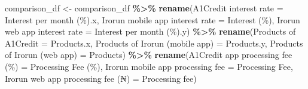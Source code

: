 \documentclass[
]{article}
\newenvironment{Shaded}{\begin{snugshade}}{\end{snugshade}}
\newcommand{\AttributeTok}[1]{\textcolor[rgb]{0.13,0.29,0.53}{#1}}
\newcommand{\FunctionTok}[1]{\textcolor[rgb]{0.13,0.29,0.53}{\textbf{#1}}}
\newcommand{\NormalTok}[1]{#1}
\newcommand{\OtherTok}[1]{\textcolor[rgb]{0.56,0.35,0.01}{#1}}
\newcommand{\SpecialCharTok}[1]{\textcolor[rgb]{0.81,0.36,0.00}{\textbf{#1}}}
\newcommand{\StringTok}[1]{\textcolor[rgb]{0.31,0.60,0.02}{#1}}
\begin{document}
\begin{Shaded}
\begin{Highlighting}[]
\NormalTok{comparison\_df }\OtherTok{\textless{}{-}}\NormalTok{ comparison\_df }\SpecialCharTok{\%\textgreater{}\%}
  \FunctionTok{rename}\NormalTok{(}\StringTok{\textasciigrave{}}\AttributeTok{A1Credit interest rate}\StringTok{\textasciigrave{}} \OtherTok{=} \StringTok{\textasciigrave{}}\AttributeTok{Interest per month (\%).x}\StringTok{\textasciigrave{}}\NormalTok{,}
         \StringTok{\textasciigrave{}}\AttributeTok{Irorun mobile app interest rate}\StringTok{\textasciigrave{}} \OtherTok{=} \StringTok{\textasciigrave{}}\AttributeTok{Interest (\%)}\StringTok{\textasciigrave{}}\NormalTok{,}
         \StringTok{\textasciigrave{}}\AttributeTok{Irorun web app interest rate}\StringTok{\textasciigrave{}} \OtherTok{=} \StringTok{\textasciigrave{}}\AttributeTok{Interest per month (\%).y}\StringTok{\textasciigrave{}}\NormalTok{) }\SpecialCharTok{\%\textgreater{}\%} 
  \FunctionTok{rename}\NormalTok{(}\StringTok{\textasciigrave{}}\AttributeTok{Products of A1Credit}\StringTok{\textasciigrave{}} \OtherTok{=}\NormalTok{ Products.x,}
         \StringTok{\textasciigrave{}}\AttributeTok{Products of Irorun (mobile app)}\StringTok{\textasciigrave{}} \OtherTok{=}\NormalTok{ Products.y,}
         \StringTok{\textasciigrave{}}\AttributeTok{Products of Irorun (web app)}\StringTok{\textasciigrave{}} \OtherTok{=}\NormalTok{ Products) }\SpecialCharTok{\%\textgreater{}\%} 
  \FunctionTok{rename}\NormalTok{(}\StringTok{\textasciigrave{}}\AttributeTok{A1Credit app processing fee (\%)}\StringTok{\textasciigrave{}} \OtherTok{=} \StringTok{\textasciigrave{}}\AttributeTok{Processing Fee (\%)}\StringTok{\textasciigrave{}}\NormalTok{,}
         \StringTok{\textasciigrave{}}\AttributeTok{Irorun mobile app processing fee}\StringTok{\textasciigrave{}} \OtherTok{=} \StringTok{\textasciigrave{}}\AttributeTok{Processing Fee}\StringTok{\textasciigrave{}}\NormalTok{,}
         \StringTok{\textasciigrave{}}\AttributeTok{Irorun web app processing fee (₦)}\StringTok{\textasciigrave{}} \OtherTok{=} \StringTok{\textasciigrave{}}\AttributeTok{Processing fee}\StringTok{\textasciigrave{}}\NormalTok{)}
\end{Highlighting}
\end{Shaded}
\end{document}
